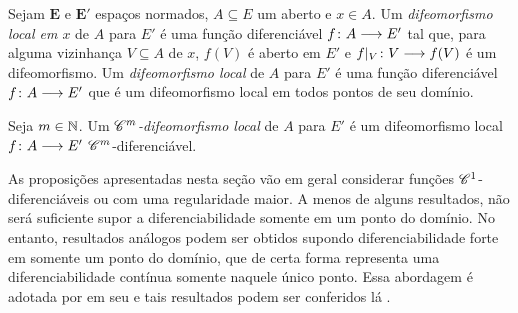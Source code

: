 \begin{definition}
Sejam $\bm E$ e $\bm E'$ espaços normados, $A \subseteq E$ um aberto e $x \in A$. Um \emph{difeomorfismo local em $x$} de $A$ para $E'$ é uma função diferenciável ${f}\colon {A} \longrightarrow {E'}$ tal que, para alguma vizinhança $V \subseteq A$ de $x$, $f(V)$ é aberto em $E'$ e ${f|_V}\colon {V} \longrightarrow {f(V)}$ é um difeomorfismo.
Um \emph{difeomorfismo local} de $A$ para $E'$ é uma função diferenciável ${f}\colon {A} \longrightarrow {E'}$ que é um difeomorfismo local em todos pontos de seu domínio.

Seja $m \in \mathbb{N}$. Um \emph{$\mathscr{C}^m$-difeomorfismo local} de $A$ para $E'$ é um difeomorfismo local ${f}\colon {A} \longrightarrow {E'}$ $\mathscr{C}^m$-diferenciável.
\end{definition}

As proposições apresentadas nesta seção vão em geral considerar funções $\mathscr{C}^1$-diferenciáveis ou com uma regularidade maior. A menos de alguns resultados, não será suficiente supor a diferenciabilidade somente em um ponto do domínio. No entanto, resultados análogos podem ser obtidos supondo diferenciabilidade forte em somente um ponto do domínio, que de certa forma representa uma diferenciabilidade contínua somente naquele único ponto. Essa abordagem é adotada por \citeauthor{liv:Lima-CursoAnalise2} em seu  e tais resultados podem ser conferidos lá \cite[pp. 286, 287]{liv:Lima-CursoAnalise2}.




